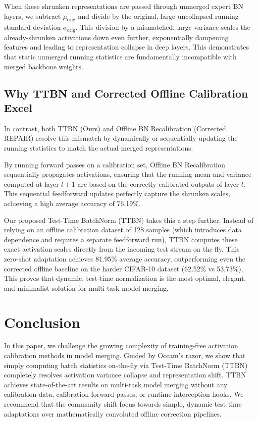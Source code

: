 \documentclass{article}
\theoremstyle{plain}
\theoremstyle{definition}
\theoremstyle{remark}
\begin{document}
When these shrunken representations are passed through unmerged expert BN layers, we subtract $\mu_{\text{orig}}$ and divide by the original, large uncollapsed running standard deviation $\sigma_{\text{orig}}$. This division by a mismatched, large variance scales the already-shrunken activations down even further, exponentially dampening features and leading to representation collapse in deep layers. This demonstrates that static unmerged running statistics are fundamentally incompatible with merged backbone weights.

\subsection{Why TTBN and Corrected Offline Calibration Excel}

In contrast, both TTBN (Ours) and Offline BN Recalibration (Corrected REPAIR) resolve this mismatch by dynamically or sequentially updating the running statistics to match the actual merged representations. 

By running forward passes on a calibration set, Offline BN Recalibration sequentially propagates activations, ensuring that the running mean and variance computed at layer $l+1$ are based on the correctly calibrated outputs of layer $l$. This sequential feedforward updates perfectly capture the shrunken scales, achieving a high average accuracy of 76.19\%.

Our proposed Test-Time BatchNorm (TTBN) takes this a step further. Instead of relying on an offline calibration dataset of 128 samples (which introduces data dependence and requires a separate feedforward run), TTBN computes these exact activation scales directly from the incoming test stream on the fly. This zero-shot adaptation achieves 81.95\% average accuracy, outperforming even the corrected offline baseline on the harder CIFAR-10 dataset (62.52\% vs 53.73\%). This proves that dynamic, test-time normalization is the most optimal, elegant, and minimalist solution for multi-task model merging.

\section{Conclusion}
\label{conclusion}

In this paper, we challenge the growing complexity of training-free activation calibration methods in model merging. Guided by Occam's razor, we show that simply computing batch statistics on-the-fly via Test-Time BatchNorm (TTBN) completely resolves activation variance collapse and representation shift. TTBN achieves state-of-the-art results on multi-task model merging without any calibration data, calibration forward passes, or runtime interception hooks. We recommend that the community shift focus towards simple, dynamic test-time adaptations over mathematically convoluted offline correction pipelines.



\end{document}
